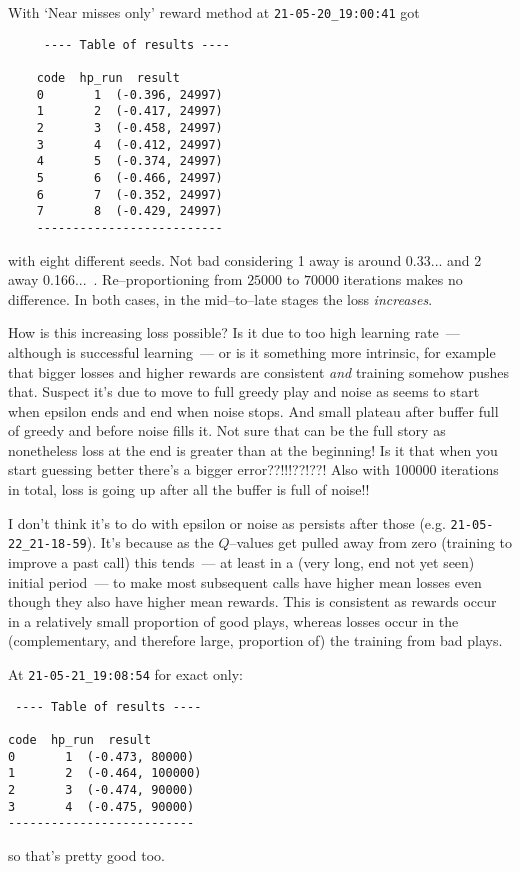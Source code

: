 \documentclass[12pt]{article}
\begin{document}
With `Near misses only' reward method at \verb|21-05-20_19:00:41| got
\begin{lstlisting}
	 ---- Table of results ----
	
	code  hp_run  result
	0       1  (-0.396, 24997)
	1       2  (-0.417, 24997)
	2       3  (-0.458, 24997)
	3       4  (-0.412, 24997)
	4       5  (-0.374, 24997)
	5       6  (-0.466, 24997)
	6       7  (-0.352, 24997)
	7       8  (-0.429, 24997)
	--------------------------
\end{lstlisting}
with eight different seeds.  Not bad considering 1 away is around 0.33... and 2 away 0.166...\ .  Re--proportioning from $\num{25000}$ to $\num{70000}$ iterations makes no difference.  In both cases, in the mid--to--late stages the loss {\em increases}.
\begin{enumerate}
	\todot How is this increasing loss possible?  Is it due to too high learning rate~--- although is successful learning~--- or is it something more intrinsic, for example that bigger losses and higher rewards are consistent {\em and} training somehow pushes that.  Suspect it's due to move to full greedy play and noise as seems to start when epsilon ends and end when noise stops.  And small plateau after buffer full of greedy and before noise fills it. Not sure that can be the full story as nonetheless loss at the end is greater than at the beginning!  Is it that when you start guessing better there's a bigger error??!!!??!??!  Also with \num{100000} iterations in total, loss is going up after all the buffer is full of noise!!
	
	I don't think it's to do with epsilon or noise as persists after those (e.g. \verb|21-05-22_21-18-59|).  It's because as the $Q$--values get pulled away from zero (training to improve a past call) this tends~--- at least in a (very long, end not yet seen) initial period~--- to make most subsequent calls have higher mean losses even though they also have higher mean rewards.  This is consistent as rewards occur in a relatively small proportion of good plays,  whereas losses occur in the (complementary, and therefore large, proportion of) the training from bad plays.
\end{enumerate}

At \verb|21-05-21_19:08:54| for exact only:
\begin{lstlisting}
 ---- Table of results ----

code  hp_run  result
0       1  (-0.473, 80000)
1       2  (-0.464, 100000)
2       3  (-0.474, 90000)
3       4  (-0.475, 90000)
--------------------------
\end{lstlisting}
so that's pretty good too.
\end{document}
